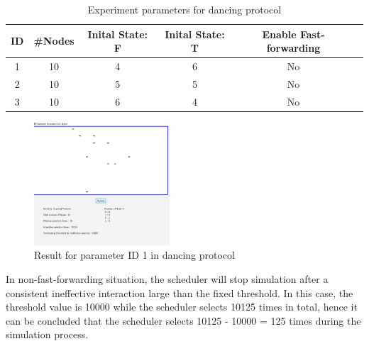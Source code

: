 \begin{table}[H]
\centering
\caption{Experiment parameters for dancing protocol}
\label{danceParas}
\begin{tabular}{|c|c|c|c|c|c|}
\hline
ID & \#Nodes & Inital State: F & Inital State: T & Enable Fast-forwarding  \\ \hline
1  & 10      & 4               & 6               & No                      \\ \hline
2  & 10      & 5               & 5               & No                      \\ \hline
3  & 10      & 6               & 4               & No                      \\ \hline
\end{tabular}
\end{table}

\FloatBarrier
\begin{figure}[H]
\begin{center}
\includegraphics[width =0.45\textwidth]{context/diagram/Dancing_NoneFastForwardingF6.png}
\caption{Result for parameter ID 1 in dancing protocol}
\label{capture_dance_res1}
\end{center}
\end{figure}
\par\noindent
In non-fast-forwarding situation, the scheduler will stop simulation after a consistent ineffective interaction
large than the fixed threshold. In this case, the threshold value is 10000 while the scheduler selects 10125 times in total,
hence it can be concluded that the scheduler selects 10125 - 10000 = 125 times during the simulation process.

